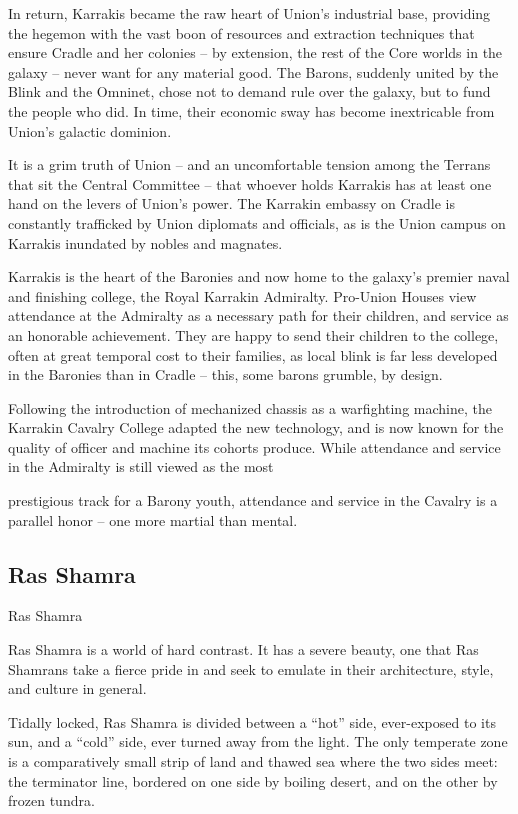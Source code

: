 In return, Karrakis became the raw heart of Union’s industrial base, providing the hegemon with
the vast boon of resources and extraction techniques that ensure Cradle and her colonies -- by
extension, the rest of the Core worlds in the galaxy -- never want for any material good. The
Barons, suddenly united by the Blink and the Omninet, chose not to demand rule over the galaxy,
but to fund the people who did. In time, their economic sway has become inextricable from
Union’s galactic dominion.

It is a grim truth of Union -- and an uncomfortable tension among the Terrans that sit the Central
Committee -- that whoever holds Karrakis has at least one hand on the levers of Union’s power.
The Karrakin embassy on Cradle is constantly trafficked by Union diplomats and officials, as is the
Union campus on Karrakis inundated by nobles and magnates.

Karrakis is the heart of the Baronies and now home to the galaxy’s premier naval and finishing
college, the Royal Karrakin Admiralty. Pro-Union Houses view attendance at the Admiralty as a
necessary path for their children, and service as an honorable achievement. They are happy to
send their children to the college, often at great temporal cost to their families, as local blink is far
less developed in the Baronies than in Cradle -- this, some barons grumble, by design.

Following the introduction of mechanized chassis as a warfighting machine, the Karrakin Cavalry
College adapted the new technology, and is now known for the quality of officer and machine its
cohorts produce. While attendance and service in the Admiralty is still viewed as the most




prestigious track for a Barony youth, attendance and service in the Cavalry is a parallel honor --
one more martial than mental.
\subsection{Ras Shamra}
Ras Shamra

Ras Shamra is a world of hard contrast. It has a severe beauty, one that Ras Shamrans take a
fierce pride in and seek to emulate in their architecture, style, and culture in general.

Tidally locked, Ras Shamra is divided between a “hot” side, ever-exposed to its sun, and a “cold”
side, ever turned away from the light. The only temperate zone is a comparatively small strip of
land and thawed sea where the two sides meet: the terminator line, bordered on one side by
boiling desert, and on the other by frozen tundra.

